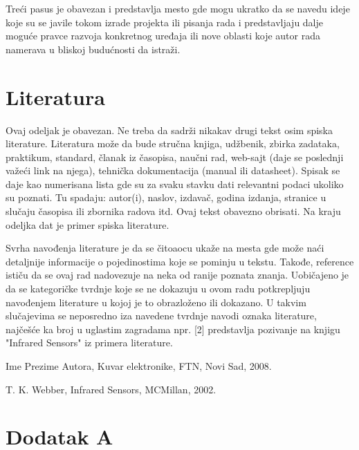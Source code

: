 \documentclass[a4paper, 12pt]{article}
\begin{document}
\vspace{10pt}

Treći pasus je obavezan i predstavlja mesto gde mogu ukratko da se navedu ideje koje su se javile tokom izrade projekta ili pisanja rada i predstavljaju dalje moguće pravce razvoja konkretnog uređaja ili nove oblasti koje autor rada namerava u bliskoj budućnosti da istraži.
\pagebreak

\section{Literatura}

\vspace{10pt}


Ovaj odeljak je obavezan. Ne treba da sadrži nikakav drugi tekst osim spiska literature. Literatura može da bude stručna knjiga, udžbenik, zbirka zadataka, praktikum, standard, članak iz časopisa, naučni rad, web-sajt (daje se poslednji važeći link na njega), tehnička dokumentacija (manual ili datasheet). Spisak se daje kao numerisana lista gde su za svaku stavku dati relevantni podaci ukoliko su poznati. Tu spadaju: autor(i), naslov, izdavač, godina izdanja, stranice u slučaju časopisa ili zbornika radova itd. Ovaj tekst obavezno obrisati. Na kraju odeljka dat je primer spiska literature.

\vspace{10pt}

Svrha navođenja literature je da se čitoaocu ukaže na mesta gde može naći detaljnije informacije o pojedinostima koje se pominju u tekstu. Takođe, reference ističu da se ovaj rad nadovezuje na neka od ranije poznata znanja. Uobičajeno je da se kategoričke tvrdnje koje se ne dokazuju u ovom radu potkrepljuju navođenjem literature u kojoj je to obrazloženo ili dokazano. U takvim slučajevima se neposredno iza navedene tvrdnje navodi oznaka literature, najčešće ka broj u uglastim zagradama npr. [2] predstavlja pozivanje na knjigu "Infrared Sensors" iz primera literature.


\begin{enumerate}[label={[1]},leftmargin=2.5cm]
	\item Ime Prezime Autora, Kuvar elektronike, FTN, Novi Sad, 2008.
	\item T. K. Webber, Infrared Sensors, MCMillan, 2002.
\end{enumerate}
\pagebreak

\section*{Dodatak A}
\end{document}
